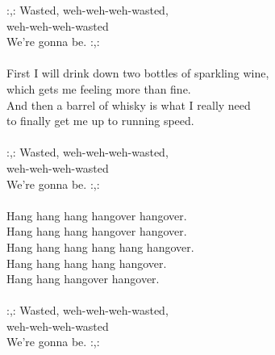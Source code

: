 
            :,: Wasted, weh-weh-weh-wasted, \\
            weh-weh-weh-wasted \\
            We’re gonna be. :,: \\
\hspace{10mm} \\
            First I will drink down two bottles of sparkling wine, \\
            which gets me feeling more than fine. \\
            And then a barrel of whisky is what I really need \\
            to finally get me up to running speed. \\
\hspace{10mm} \\
            :,: Wasted, weh-weh-weh-wasted, \\
            weh-weh-weh-wasted \\
            We’re gonna be. :,: \\
\hspace{10mm} \\
            Hang hang hang hangover hangover. \\
            Hang hang hang hangover hangover. \\
            Hang hang hang hang hang hangover. \\
            Hang hang hang hang hangover. \\
            Hang hang hangover hangover. \\
\hspace{10mm} \\
            :,: Wasted, weh-weh-weh-wasted, \\
            weh-weh-weh-wasted \\
            We’re gonna be. :,: \\
